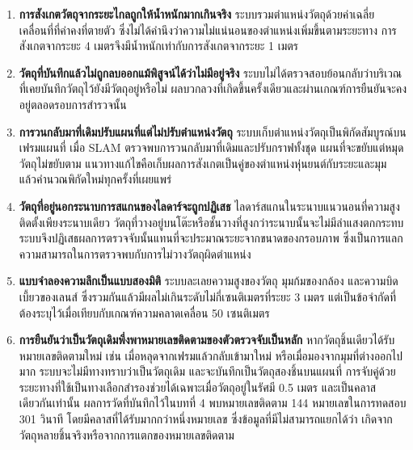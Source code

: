 \documentclass[a4paper,12pt]{report}
\begin{document}
\begin{enumerate}[label=\arabic*., leftmargin=1.25cm, itemsep=6pt, topsep=6pt]
    \item \textbf{การสังเกตวัตถุจากระยะไกลถูกให้น้ำหนักมากเกินจริง}
    ระบบรวมตำแหน่งวัตถุด้วยค่าเฉลี่ยเคลื่อนที่ที่ค่าคงที่ตายตัว
    ซึ่งไม่ได้คำนึงว่าความไม่แน่นอนของตำแหน่งเพิ่มขึ้นตามระยะทาง
    การสังเกตจากระยะ 4 เมตรจึงมีน้ำหนักเท่ากับการสังเกตจากระยะ 1 เมตร

    \item \textbf{วัตถุที่บันทึกแล้วไม่ถูกลบออกแม้พิสูจน์ได้ว่าไม่มีอยู่จริง}
    ระบบไม่ได้ตรวจสอบย้อนกลับว่าบริเวณที่เคยบันทึกวัตถุไว้ยังมีวัตถุอยู่หรือไม่
    ผลบวกลวงที่เกิดขึ้นครั้งเดียวและผ่านเกณฑ์การยืนยันจะคงอยู่ตลอดรอบการสำรวจนั้น

    \item \textbf{การวนกลับมาที่เดิมปรับแผนที่แต่ไม่ปรับตำแหน่งวัตถุ}
    ระบบเก็บตำแหน่งวัตถุเป็นพิกัดสัมบูรณ์บนเฟรมแผนที่
    เมื่อ SLAM ตรวจพบการวนกลับมาที่เดิมและปรับกราฟทั้งชุด แผนที่จะขยับแต่หมุดวัตถุไม่ขยับตาม
    แนวทางแก้ไขคือเก็บผลการสังเกตเป็นคู่ของตำแหน่งหุ่นยนต์กับระยะและมุม
    แล้วคำนวณพิกัดใหม่ทุกครั้งที่เผยแพร่

    \item \textbf{วัตถุที่อยู่นอกระนาบการสแกนของไลดาร์จะถูกปฏิเสธ}
    ไลดาร์สแกนในระนาบแนวนอนที่ความสูงติดตั้งเพียงระนาบเดียว
    วัตถุที่วางอยู่บนโต๊ะหรือชั้นวางที่สูงกว่าระนาบนั้นจะไม่มีลำแสงตกกระทบ
    ระบบจึงปฏิเสธผลการตรวจจับนั้นแทนที่จะประมาณระยะจากขนาดของกรอบภาพ
    ซึ่งเป็นการแลกความสามารถในการตรวจพบกับการไม่วางวัตถุผิดตำแหน่ง

    \item \textbf{แบบจำลองความลึกเป็นแบบสองมิติ}
    ระบบละเลยความสูงของวัตถุ มุมก้มของกล้อง และความบิดเบี้ยวของเลนส์
    ซึ่งรวมกันแล้วมีผลไม่เกินระดับไม่กี่เซนติเมตรที่ระยะ 3 เมตร
    แต่เป็นข้อจำกัดที่ต้องระบุไว้เมื่อเทียบกับเกณฑ์ความคลาดเคลื่อน 50 เซนติเมตร

    \item \textbf{การยืนยันว่าเป็นวัตถุเดิมพึ่งพาหมายเลขติดตามของตัวตรวจจับเป็นหลัก}
    หากวัตถุชิ้นเดียวได้รับหมายเลขติดตามใหม่ เช่น เมื่อหลุดจากเฟรมแล้วกลับเข้ามาใหม่
    หรือเมื่อมองจากมุมที่ต่างออกไปมาก ระบบจะไม่มีทางทราบว่าเป็นวัตถุเดิม
    และจะบันทึกเป็นวัตถุสองชิ้นบนแผนที่
    การจับคู่ด้วยระยะทางที่ใช้เป็นทางเลือกสำรองช่วยได้เฉพาะเมื่อวัตถุอยู่ในรัศมี 0.5 เมตร
    และเป็นคลาสเดียวกันเท่านั้น
    ผลการวัดที่บันทึกไว้ในบทที่ 4 พบหมายเลขติดตาม 144 หมายเลขในการทดสอบ 301 วินาที
    โดยมีคลาสที่ได้รับมากกว่าหนึ่งหมายเลข ซึ่งข้อมูลที่มีไม่สามารถแยกได้ว่า
    เกิดจากวัตถุหลายชิ้นจริงหรือจากการแตกของหมายเลขติดตาม


\end{enumerate}
\end{document}

